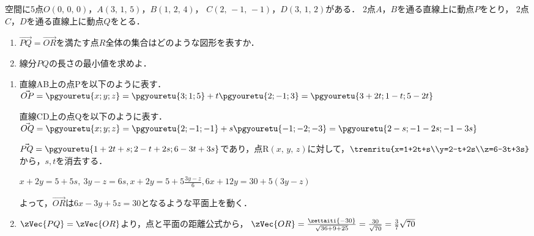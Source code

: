 \begin{problem}
  空間に5点$O(0, \, 0, \, 0)$，$A(3, \, 1, \, 5)$，$B(1, \, 2, \, 4)$，
$C(2, \, -1, \, -1)$，$D(3, \, 1, \, 2)$がある．
2点$A$，$B$を通る直線上に動点$P$をとり，
2点$C$，$D$を通る直線上に動点$Q$をとる．
\begin{enumerate}
\item $\overrightarrow{PQ}=\overrightarrow{OR}$を満たす点$R$全体の集合はどのような図形を表すか．
\item 線分$PQ$の長さの最小値を求めよ．
\end{enumerate}
\end{problem}

\begin{enumerate}
  \item 直線AB上の点Pを以下のように表す．
  $\Vec{OP} = \pgyouretu{x;y;z} = \pgyouretu{3;1;5} + t\pgyouretu{2;-1;3} = \pgyouretu{3+2t;1-t;5-2t}$

  直線CD上の点Qを以下のように表す．
  $\Vec{OQ} = \pgyouretu{x;y;z} = \pgyouretu{2;-1;-1} + s\pgyouretu{-1;-2;-3} = \pgyouretu{2-s;-1-2s;-1-3s}$

  $\Vec{PQ} = \pgyouretu{1+2t+s;2-t+2s;6-3t+3s}$であり，点R$(x,\,y,\,z)$に対して，$\trenritu{x=1+2t+s\\y=2-t+2s\\z=6-3t+3s}$から，$s,t$を消去する．

  $x+2y = 5+5s,\ 3y-z=6s, x+2y=5+5\frac{3y-z}{6}, 6x+12y=30+5(3y-z)$

  よって，$\Vec{OR}$は$6x-3y+5z=30$となるような平面上を動く．

  \item $\zVec{PQ} = \zVec{OR}$より，点と平面の距離公式から，
  $\zVec{OR} = \frac{\zettaiti{-30}}{\sqrt{36+9+25}} = \frac{30}{\sqrt{70}} = \frac37\sqrt{70}$

\end{enumerate}
